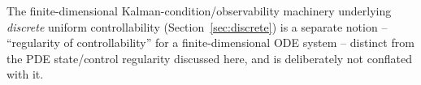 \begin{remark}
  The finite-dimensional Kalman-condition/observability machinery underlying
  \emph{discrete} uniform controllability (Section~\ref{sec:discrete}) is a
  separate notion -- ``regularity of controllability'' for a finite-dimensional
  ODE system -- distinct from the PDE state/control regularity discussed here,
  and is deliberately not conflated with it.
\end{remark}
